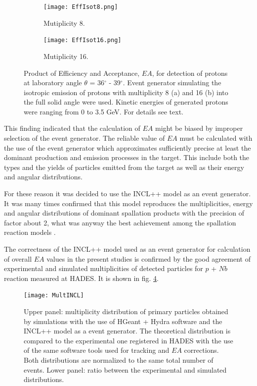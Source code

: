 \begin{figure}[!ht]
    \centering
	\begin{subfigure}[b]{0.45\textwidth}
		\texttt{[image: EffIsot8.png]}
		\caption{\label{IsoEff8} Mutiplicity 8.}
	\end{subfigure}
	\begin{subfigure}[b]{0.45\textwidth}
		\texttt{[image: EffIsot16.png]}
		\caption{\label{IsoEff16} Mutiplicity 16.}
	\end{subfigure}
	\caption{\label{IsoEff} Product of Efficiency and Acceptance,  $EA$, for detection of protons at laboratory angle $\theta$ = 36$^\circ$ - 39$^\circ$. Event generator simulating the isotropic emission of protons with multiplicity 8 (a) and 16 (b) into the full solid angle were used. Kinetic energies of generated protons were ranging from 0 to 3.5 GeV. For details see text.}
\end{figure}    

This finding indicated that the calculation of $EA$ might 
be biased by improper selection of the  event generator. The reliable value of $EA$ must be calculated with the use of the event generator
which approximates sufficiently precise at least the dominant production and emission processes 
in the target. This include both the types and the yields of particles emitted from the target as well as their energy and angular distributions.


For these reason it was decided to use the INCL++ model as an event generator. It was many times confirmed that this model reproduces the multiplicities, energy and angular distributions of dominant spallation products with the precision of factor about 2, what was anyway the best achievement among the spallation reaction models \cite{INCLMancusi2014}.
 
    
The correctness of the INCL++ model used as an event generator for calculation of overall $EA$ values in the present studies is confirmed by the good agreement of experimental and simulated multiplicities of detected particles for $p$ + $Nb$ reaction measured at HADES. It is shown 
in fig. \ref{MultINCL}.  

\begin{figure}[!ht]
	\centering
	\texttt{[image: MultINCL]}
	\caption{Upper panel: multiplicity distribution of primary particles obtained by simulations with the use of HGeant + Hydra software and the INCL++ model as a event generator.
	The theoretical distribution is compared to the experimental one registered in HADES with the use of the same software tools used for tracking and $EA$ corrections. 
	Both distributions are normalized to the same total number of events. Lower panel: ratio between the experimental and simulated distributions.}
	\label{MultINCL}
    \end{figure}


